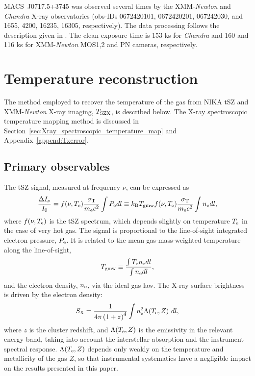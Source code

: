 \documentclass[twocolumn,traditabstract]{aa}
\newcommand{\ccor}[1]{\textcolor{Mypink}{#1}}
\def\TSZ {T_{\rm SZX}}
\def\TMW {T_{\rm gmw}}
\begin{document}
\mbox{MACS~J0717.5+3745} was observed several times by the XMM-\textit{Newton} and \textit{Chandra} X-ray observatories (obs-IDs 0672420101, 0672420201, 067242030, and \ccor{1655, 4200, 16235, 16305}, respectively). The data processing follows the description given in \cite{Adam2016b}. The clean exposure time is 153 ks for \textit{Chandra} and 160 and 116 ks for XMM-\textit{Newton} MOS1,2 and PN cameras, respectively.

\section{Temperature reconstruction}\label{sec:method}
\ccor{The method employed to recover the temperature of the gas from NIKA tSZ and XMM-\textit{Newton} X-ray imaging, $\TSZ$, is described below. The X-ray spectroscopic temperature mapping method is discussed in Section~\ref{sec:Xray_spectroscopic_temperature_map} and Appendix~\ref{append:Txerror}.}

\subsection{Primary observables}
The tSZ signal, measured at frequency $\nu$, can be expressed as
\begin{equation}
	\frac{\Delta I_{\nu}}{I_0} = f(\nu, T_{\rm e}) \frac{\sigma_{\rm T}}{m_{\rm e} c^2} \int P_{\rm e} dl \equiv k_{\rm B} \TMW f(\nu, T_{\rm e}) \frac{\sigma_{\rm T}}{m_{\rm e} c^2} \int n_{\rm e} dl,
\label{eq:dIsz}
\end{equation}
where $f(\nu, T_{\rm e})$ is the tSZ spectrum, which depends slightly on temperature $T_{\rm e}$ in the case of very hot gas. The signal is proportional to the line-of-sight integrated electron pressure, $P_{\rm e}$. It is related to the mean gas-mass-weighted temperature along the line-of-sight, 
\begin{equation}
       \TMW  \equiv \frac{\int T_{\rm e} n_{\rm e} dl}{\int n_{\rm e} dl},
        \label{eq:Tgmw_def}
\end{equation}
and the electron density, $n_{\rm e}$, via the ideal gas law. The X-ray surface brightness is driven by the electron density:
\begin{equation}
        S_{\rm X}= \frac{1}{4 \pi \left(1+z\right)^4} \int n_{\rm e}^2 \Lambda(T_{\rm e}, Z) \ dl,
        \label{eq:sx}
\end{equation}
where $z$ is the cluster redshift, and $\Lambda(T_{\rm e}, Z)$ is the emissivity in the relevant energy band, taking into account the interstellar absorption and the instrument spectral response. $\Lambda(T_{\rm e}, Z)$ depends only weakly on the temperature and metallicity of the gas $Z$, so that instrumental systematics have a negligible impact on the results presented in this paper.
\end{document}
